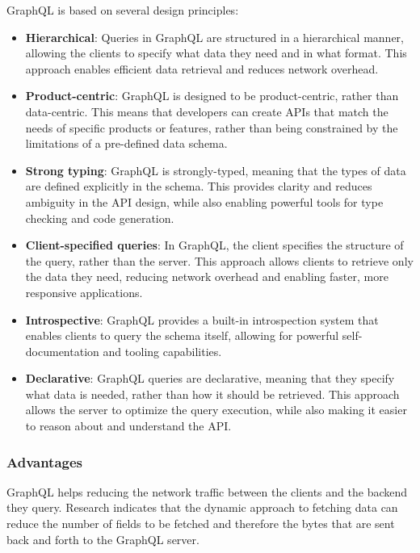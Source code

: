 GraphQL is based on several design principles: \cite{misc:-:background:graphql:graphql-specification}

\begin{itemize}
    \item \textbf{Hierarchical}: Queries in GraphQL are structured in a hierarchical manner, allowing the clients to specify what data they need and in what format. This approach enables efficient data retrieval and reduces network overhead.

    \item \textbf{Product-centric}: GraphQL is designed to be product-centric, rather than data-centric. This means that developers can create APIs that match the needs of specific products or features, rather than being constrained by the limitations of a pre-defined data schema.

    \item \textbf{Strong typing}: GraphQL is strongly-typed, meaning that the types of data are defined explicitly in the schema. This provides clarity and reduces ambiguity in the API design, while also enabling powerful tools for type checking and code generation.

    \item \textbf{Client-specified queries}: In GraphQL, the client specifies the structure of the query, rather than the server. This approach allows clients to retrieve only the data they need, reducing network overhead and enabling faster, more responsive applications.

    \item \textbf{Introspective}: GraphQL provides a built-in introspection system that enables clients to query the schema itself, allowing for powerful self-documentation and tooling capabilities.

    \item \textbf{Declarative}: GraphQL queries are declarative, meaning that they specify what data is needed, rather than how it should be retrieved. This approach allows the server to optimize the query execution, while also making it easier to reason about and understand the API.
\end{itemize}

\subsubsection{Advantages}

GraphQL helps reducing the network traffic between the clients and the backend they query. Research indicates that the dynamic approach to fetching data can reduce the number of fields to be fetched and therefore the bytes that are sent back and forth to the GraphQL server. \cite{inprocessdings:2019:background:graphql:migration-to-graphql}

